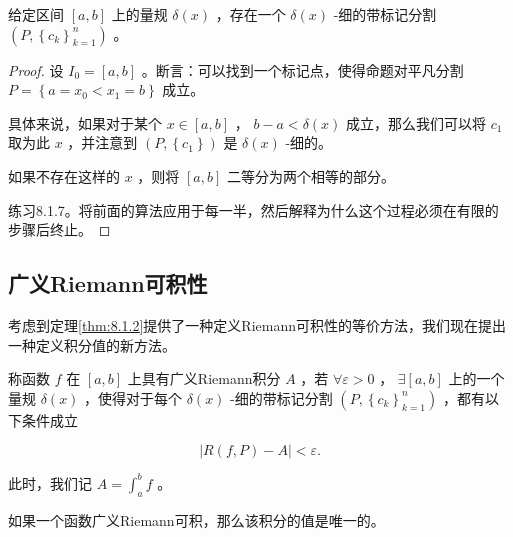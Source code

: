 \begin{Thm}
  \label{thm:8.1.5}
  给定区间 \(\left\lbrack  {a,b}\right\rbrack\) 上的量规 \(\delta \left( x\right)\) ，存在一个 \(\delta \left( x\right)\) -细的带标记分割 \(\left( {P,{\left\{  {c}_{k}\right\}  }_{k = 1}^{n}}\right)\) 。
\end{Thm}

\begin{proof}
  设 \({I}_{0} = \left\lbrack  {a,b}\right\rbrack\) 。断言：可以找到一个标记点，使得命题对平凡分割 \(P = \left\{  {a = {x}_{0} < {x}_{1} = b}\right\}\) 成立。

  具体来说，如果对于某个 \(x \in  \left\lbrack  {a,b}\right\rbrack\) ， \(b - a < \delta \left( x\right)\) 成立，那么我们可以将 \({c}_{1}\) 取为此 \(x\) ，并注意到 \(\left( {P,\left\{  {c}_{1}\right\}  }\right)\) 是 \(\delta \left( x\right)\) -细的。

  如果不存在这样的 \(x\) ，则将 \(\left\lbrack  {a,b}\right\rbrack\) 二等分为两个相等的部分。

练习8.1.7。将前面的算法应用于每一半，然后解释为什么这个过程必须在有限的步骤后终止。
\end{proof}


\subsection{广义Riemann可积性}

考虑到定理\ref{thm:8.1.2}提供了一种定义Riemann可积性的等价方法，我们现在提出一种定义积分值的新方法。

\begin{Def}[广义Riemann可积性]
  \label{def:8.1.6}
  称函数 \(f\) 在 \(\left\lbrack  {a,b}\right\rbrack\) 上具有广义Riemann积分 \(A\) ，若 \(\forall \varepsilon  > 0\) ， \(\exists \left\lbrack  {a,b}\right\rbrack\) 上的一个量规 \(\delta \left( x\right)\) ，使得对于每个 \(\delta \left( x\right)\) -细的带标记分割 \(\left( {P,{\left\{  {c}_{k}\right\}  }_{k = 1}^{n}}\right)\) ，都有以下条件成立

\[
\left| {R\left( {f,P}\right)  - A}\right|  < \varepsilon .
\]

此时，我们记 \(A = {\int }_{a}^{b}f\) 。
\end{Def}

\begin{Thm}
  \label{thm:8.1.7}
  如果一个函数广义Riemann可积，那么该积分的值是唯一的。
\end{Thm}

